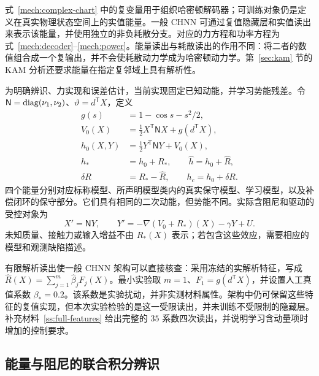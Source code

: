 式~\eqref{mech:complex-chart} 中的复变量用于组织哈密顿解码器；可训练对象仍是定义在真实物理状态空间上的实值能量。一般 CHNN 可通过复值隐藏层和实值读出来表示该能量，并使用独立的非负耗散分支。对应的力方程和功率方程为式~\eqref{mech:decoder}--\eqref{mech:power}。能量读出与耗散读出的作用不同：将二者的数值组合成一个复输出，并不会使耗散动力学成为哈密顿动力学。第~\ref{sec:kam} 节的 KAM 分析还要求能量在指定复邻域上具有解析性。

为明确辨识、力实现和误差估计，当前实现固定已知动能，并学习势能残差。令 $\mathsf N=\operatorname{diag}(\nu_1,\nu_2)$、$\vartheta=d^{\mathsf T}X$，定义
\begin{equation}\label{struct:objects}
\begin{aligned}
 g(s)&=1-\cos s-s^2/2,\\
 V_0(X)&=\tfrac12X^{\mathsf T}\mathsf N X+g(d^{\mathsf T}X),\\
 h_0(X,Y)&=\tfrac12Y^{\mathsf T}\mathsf N Y+V_0(X),\\
 h_*&=h_0+R_*,\qquad \widehat h=h_0+\widehat R,\\
 \delta R&=R_*-\widehat R,\qquad h_c=h_0+\delta R.
\end{aligned}
\end{equation}
四个能量分别对应标称模型、所声明模型类内的真实保守模型、学习模型，以及补偿闭环的保守部分。它们具有相同的二次动能，但势能不同。实际含阻尼和驱动的受控对象为
\begin{equation}\label{struct:plant}
 X'=\mathsf N Y,\qquad
 Y'=-\nabla(V_0+R_*)(X)-\gamma Y+U.
\end{equation}
未知质量、接触力或输入增益不由 $R_*(X)$ 表示；若包含这些效应，需要相应的模型和观测缺陷描述。

有限解析读出使一般 CHNN 架构可以直接核查：采用冻结的实解析特征，写成 $\widehat R(X)=\sum_{j=1}^{m}\widehat\beta_jF_j(X)$。最小实验取 $m=1$、$F_1=g(d^{\mathsf T}X)$，并设置人工真值系数 $\beta_*=0.2$。该系数是实验扰动，并非实测材料属性。架构中仍可保留这些特征的复值实现，但本次实验检验的是这一受限读出，并未训练不受限制的隐藏层。补充材料~\ref{ss:full-features} 给出完整的 $35$ 系数四次读出，并说明学习含动量项时增加的控制要求。

\subsection{能量与阻尼的联合积分辨识}
\label{struct:identification-section}


